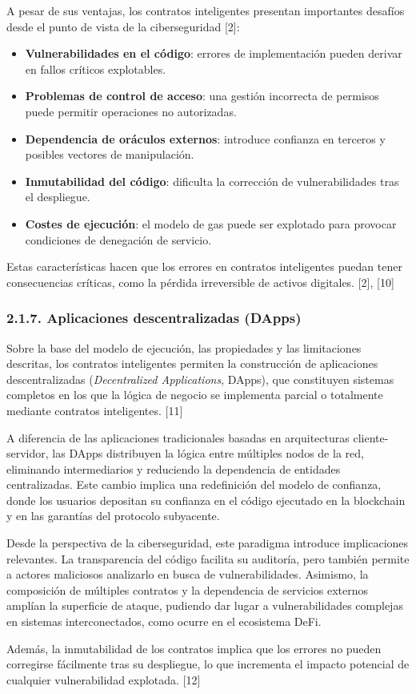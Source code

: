 A pesar de sus ventajas, los contratos inteligentes presentan
importantes desafíos desde el punto de vista de la ciberseguridad
{[}2{]}:

\begin{itemize}
\tightlist
\item
  \textbf{Vulnerabilidades en el código}: errores de implementación
  pueden derivar en fallos críticos explotables.
\item
  \textbf{Problemas de control de acceso}: una gestión incorrecta de
  permisos puede permitir operaciones no autorizadas.
\item
  \textbf{Dependencia de oráculos externos}: introduce confianza en
  terceros y posibles vectores de manipulación.
\item
  \textbf{Inmutabilidad del código}: dificulta la corrección de
  vulnerabilidades tras el despliegue.
\item
  \textbf{Costes de ejecución}: el modelo de gas puede ser explotado
  para provocar condiciones de denegación de servicio.
\end{itemize}

Estas características hacen que los errores en contratos inteligentes
puedan tener consecuencias críticas, como la pérdida irreversible de
activos digitales. {[}2{]}, {[}10{]}

\subsubsection{2.1.7. Aplicaciones descentralizadas
(DApps)}\label{aplicaciones-descentralizadas-dapps}

Sobre la base del modelo de ejecución, las propiedades y las
limitaciones descritas, los contratos inteligentes permiten la
construcción de aplicaciones descentralizadas (\emph{Decentralized
Applications}, DApps), que constituyen sistemas completos en los que la
lógica de negocio se implementa parcial o totalmente mediante contratos
inteligentes. {[}11{]}

A diferencia de las aplicaciones tradicionales basadas en arquitecturas
cliente-servidor, las DApps distribuyen la lógica entre múltiples nodos
de la red, eliminando intermediarios y reduciendo la dependencia de
entidades centralizadas. Este cambio implica una redefinición del modelo
de confianza, donde los usuarios depositan su confianza en el código
ejecutado en la blockchain y en las garantías del protocolo subyacente.

Desde la perspectiva de la ciberseguridad, este paradigma introduce
implicaciones relevantes. La transparencia del código facilita su
auditoría, pero también permite a actores maliciosos analizarlo en busca
de vulnerabilidades. Asimismo, la composición de múltiples contratos y
la dependencia de servicios externos amplían la superficie de ataque,
pudiendo dar lugar a vulnerabilidades complejas en sistemas
interconectados, como ocurre en el ecosistema DeFi.

Además, la inmutabilidad de los contratos implica que los errores no
pueden corregirse fácilmente tras su despliegue, lo que incrementa el
impacto potencial de cualquier vulnerabilidad explotada. {[}12{]}
